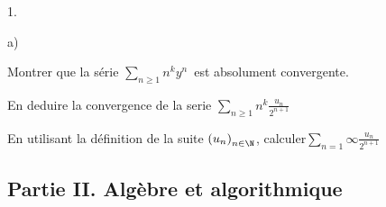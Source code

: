 \documentclass[11pt]{article}%
\begin{document}
\begin{noliste}{1.}
\begin{noliste}{a)}
 \setlength{\itemsep}{2mm}
\item Montrer que la série $\sum \limits_{n\geq1}n^{k}y^{n}$\ est
absolument convergente.

\item En deduire la convergence de la serie $\sum
\limits_{n\geq1}n^{k}\frac{u_{n}}{2^{n + 1}}$

\item En utilisant la définition de la suite $\left(
u_{n}\right)_{n\in\N}$, calculer$\sum \limits_{n =
1}{\infty}\frac{u_{n}}{2^{n + 1}}$
\end{noliste}
\end{noliste}

\subsection*{Partie II. Algèbre et algorithmique}
\end{document}
